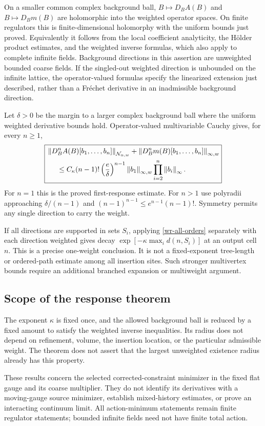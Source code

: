 \documentclass[11pt]{article}
\theoremstyle{remark}\newtheorem{remark}[theorem]{Remark}
\newcommand{\norm}[1]{\left\lVert#1\right\rVert}
\begin{document}
On a smaller common complex background ball,
$B\mapsto D_BA(B)$ and $B\mapsto D_Bm(B)$ are holomorphic
into the weighted operator spaces. On finite regulators this is
finite-dimensional holomorphy with the uniform bounds just
proved. Equivalently it follows from the local coefficient
analyticity, the H\"older product estimates, and the weighted
inverse formulas, which also apply to complete infinite fields.
Background directions in this assertion are unweighted bounded
coarse fields. If the singled-out weighted direction is unbounded
on the infinite lattice, the operator-valued formulas specify the
linearized extension just described, rather than a Fr\'echet
derivative in an inadmissible background direction.

Let $\delta>0$ be the margin to a larger complex background ball
where the uniform weighted derivative bounds hold. Operator-valued
multivariable Cauchy gives, for every $n\ge1$,
\begin{equation}\label{wr-all-orders}
 \boxed{\begin{split}
 &\norm{D_B^n A(B)[b_1,\ldots,b_n]}_{\mathcal N_{\alpha,w}}
       +\norm{D_B^n m(B)[b_1,\ldots,b_n]}_{\infty,w}\\
 &\hspace{5mm}\le C_\kappa(n-1)!
       \left(\frac e\delta\right)^{n-1}
        \norm{b_1}_{\infty,w}\prod_{i=2}^n\norm{b_i}_\infty.
 \end{split}}
\end{equation}
For $n=1$ this is the proved first-response estimate. For $n>1$
use polyradii approaching $\delta/(n-1)$ and
$(n-1)^{n-1}\le e^{n-1}(n-1)!$. Symmetry permits any single
direction to carry the weight.

If all directions are supported in sets $S_i$, applying
\eqref{wr-all-orders} separately with each direction weighted
gives decay $\exp[-\kappa\max_i d(n,S_i)]$ at an output cell
$n$. This is a precise one-weight conclusion. It is not a
fixed-exponent tree-length or ordered-path estimate among all
insertion sites. Such stronger multivertex bounds require an
additional branched expansion or multiweight argument.

\subsection{Scope of the response theorem}
\label{wr-scope}

The exponent $\kappa$ is fixed once, and the allowed background
ball is reduced by a fixed amount to satisfy the weighted
inverse inequalities. Its radius does not depend on refinement,
volume, the insertion location, or the particular admissible
weight. The theorem does not assert that the largest unweighted
existence radius already has this property.

These results concern the selected corrected-constraint minimizer
in the fixed flat gauge and its coarse multiplier. They do not
identify its derivatives with a moving-gauge source minimizer,
establish mixed-history estimates, or prove an interacting
continuum limit. All action-minimum statements remain finite
regulator statements; bounded infinite fields need not have finite
total action.
\end{document}
